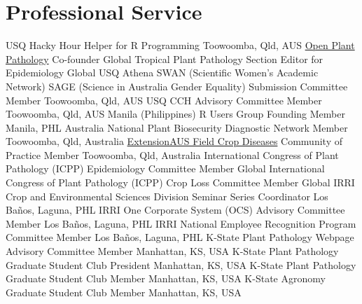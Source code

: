 \section*{Professional Service}
\begin{entrylist}
    {USQ Hacky Hour}
    {Helper for R Programming}
    {Toowoomba, Qld, AUS}
    {\href{https://www.openplantpathology.org}{Open Plant Pathology}}
    {Co-founder}
    {Global}
    {Tropical Plant Pathology}
    {Section Editor for Epidemiology}
    {Global}
    {USQ Athena SWAN (Scientific Women’s Academic Network) SAGE (Science in Australia Gender Equality) Submission Committee}
    {Member}
    {Toowoomba, Qld, AUS}
    {USQ CCH Advisory Committee}
    {Member}
    {Toowoomba, Qld, AUS}
    {Manila (Philippines) R Users Group}
    {Founding Member}
    {Manila, PHL}
    {Australia National Plant Biosecurity Diagnostic Network}
    {Member}
    {Toowoomba, Qld, Australia}
    {\href{http://extensionaus.com.au/field-crop-diseases/}{ExtensionAUS Field Crop Diseases} Community of Practice}
    {Member}
    {Toowoomba, Qld, Australia}
    {International Congress of Plant Pathology (ICPP) Epidemiology Committee}
    {Member}
    {Global}
    {International Congress of Plant Pathology (ICPP) Crop Loss Committee}
    {Member}
    {Global}
    {IRRI Crop and Environmental Sciences Division Seminar Series}
    {Coordinator}
    {Los Ba\~nos, Laguna, PHL}
    {IRRI One Corporate System (OCS) Advisory Committee}
    {Member}
    {Los Ba\~nos, Laguna, PHL}
    {IRRI National Employee Recognition Program Committee}
    {Member}
    {Los Ba\~nos, Laguna, PHL}
    {K-State Plant Pathology Webpage Advisory Committee}
    {Member}
    {Manhattan, KS, USA}
    {K-State Plant Pathology Graduate Student Club}
    {President}
    {Manhattan, KS, USA}
    {K-State Plant Pathology Graduate Student Club}
    {Member}
    {Manhattan, KS, USA}
    {K-State Agronomy Graduate Student Club}
    {Member}
    {Manhattan, KS, USA}
\end{entrylist}
